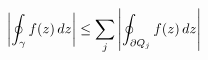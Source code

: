 \documentclass[preview]{standalone}
\begin{document}
\begin{align*}
\special{dvisvgm:raw <g id='unique000'>}\left|\oint_{\gamma} f(z)\,dz\right| \le \sum_j \left|\oint_{\partial Q_j} f(z)\,dz\right|\special{dvisvgm:raw </g>}
\end{align*}
\end{document}
